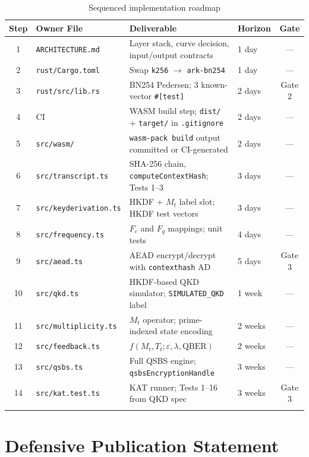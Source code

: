 \documentclass[11pt,letterpaper]{article}
\begin{document}
\begin{longtable}{@{}clp{5.5cm}lc@{}}
\toprule
\textbf{Step} & \textbf{Owner File} & \textbf{Deliverable} & \textbf{Horizon} & \textbf{Gate} \\
\midrule
\endhead
1 & \texttt{ARCHITECTURE.md} & Layer stack, curve decision, input/output contracts & 1 day & --- \\
2 & \texttt{rust/Cargo.toml} & Swap \texttt{k256} $\to$ \texttt{ark-bn254} & 1 day & --- \\
3 & \texttt{rust/src/lib.rs} & BN254 Pedersen; 3 known-vector \texttt{\#[test]} & 2 days & Gate 2 \\
4 & CI & WASM build step; \texttt{dist/} + \texttt{target/} in \texttt{.gitignore} & 2 days & --- \\
5 & \texttt{src/wasm/} & \texttt{wasm-pack build} output committed or CI-generated & 2 days & --- \\
6 & \texttt{src/transcript.ts} & SHA-256 chain, \texttt{computeContextHash}; Tests 1--3 & 3 days & --- \\
7 & \texttt{src/keyderivation.ts} & HKDF + $M_t$ label slot; HKDF test vectors & 3 days & --- \\
8 & \texttt{src/frequency.ts} & $F_c$ and $F_q$ mappings; unit tests & 4 days & --- \\
9 & \texttt{src/aead.ts} & AEAD encrypt/decrypt with \texttt{contexthash} AD & 5 days & Gate 3 \\
10 & \texttt{src/qkd.ts} & HKDF-based QKD simulator; \texttt{SIMULATED\_QKD} label & 1 week & --- \\
11 & \texttt{src/multiplicity.ts} & $M_t$ operator; prime-indexed state encoding & 2 weeks & --- \\
12 & \texttt{src/feedback.ts} & $f(M_t, T_t; \varepsilon, \lambda, \text{QBER})$ & 2 weeks & --- \\
13 & \texttt{src/qsbs.ts} & Full QSBS engine; \texttt{qsbsEncryptionHandle} & 3 weeks & --- \\
14 & \texttt{src/kat.test.ts} & KAT runner; Tests 1--16 from QKD spec & 3 weeks & Gate 3 \\
\bottomrule
\caption{Sequenced implementation roadmap}
\end{longtable}

\section{Defensive Publication Statement}
\end{document}
